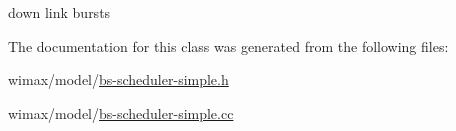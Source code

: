 down link bursts 



The documentation for this class was generated from the following files\+:\begin{DoxyCompactItemize}
\item 
wimax/model/\hyperlink{bs-scheduler-simple_8h}{bs-\/scheduler-\/simple.\+h}\item 
wimax/model/\hyperlink{bs-scheduler-simple_8cc}{bs-\/scheduler-\/simple.\+cc}\end{DoxyCompactItemize}
